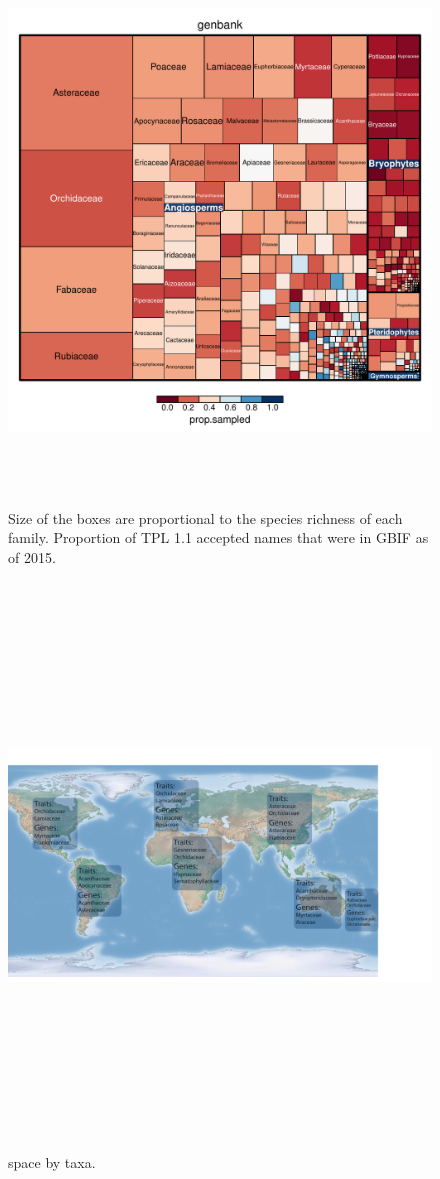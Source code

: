 \documentclass[a4paper,11pt]{article}
\begin{document}
\begin{figure}[h!]
\centering
\includegraphics[width=15cm,height=15cm,keepaspectratio]{figures/treemap_genbank.pdf}
\caption{Size of the boxes are proportional to the species richness of each family.  Proportion of TPL 1.1 accepted names that were in GBIF as of 2015.  }
\label{fig:genbank_treemap}
\end{figure}
\clearpage

\begin{figure}[h!]
\centering
\includegraphics[width=15cm,height=15cm,keepaspectratio]{figures/hyp.pdf}
\caption{ space by taxa.  }
\label{fig:hyp}
\end{figure}
\clearpage


\end{document}
